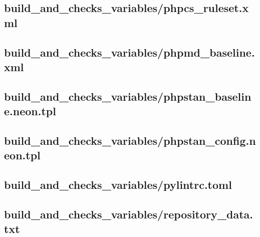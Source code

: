 \documentclass{article}
\begin{document}


\subsection{
  build\_and\_checks\_variables/phpcs\_ruleset.xml
}
\label{
  build_and_checks_variables:phpcs_rulesetxml
}



\subsection{
  build\_and\_checks\_variables/phpmd\_baseline.xml
}
\label{
  build_and_checks_variables:phpmd_baselinexml
}



\subsection{
  build\_and\_checks\_variables/phpstan\_baseline.neon.tpl
}
\label{
  build_and_checks_variables:phpstan_baselineneontpl
}



\subsection{
  build\_and\_checks\_variables/phpstan\_config.neon.tpl
}
\label{
  build_and_checks_variables:phpstan_configneontpl
}



\subsection{
  build\_and\_checks\_variables/pylintrc.toml
}
\label{
  build_and_checks_variables:pylintrctoml
}



\subsection{
  build\_and\_checks\_variables/repository\_data.txt
}
\label{
  build_and_checks_variables:repository_datatxt
}
\end{document}
